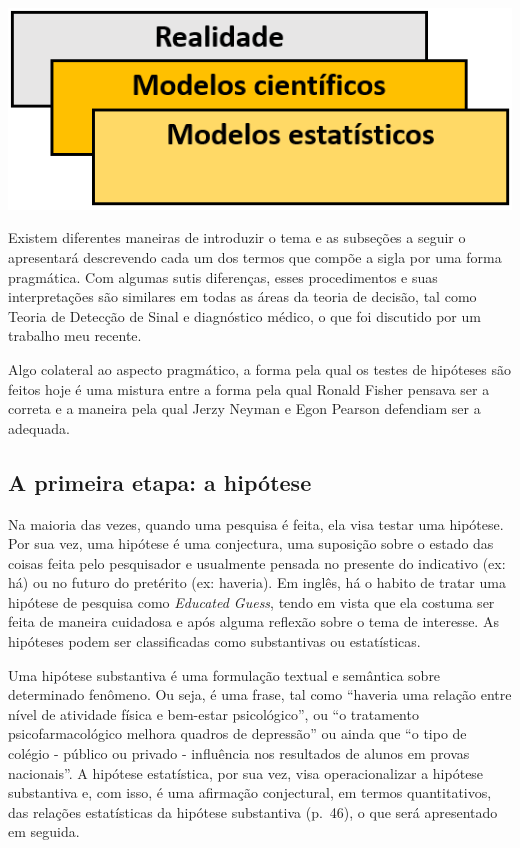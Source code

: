 \documentclass[
]{book}
\begin{document}
\includegraphics{./img/cap_inferencia_modelos_estatisticos.png}

Existem diferentes maneiras de introduzir o tema e as subseções a seguir o apresentará descrevendo cada um dos termos que compõe a sigla por uma forma pragmática. Com algumas sutis diferenças, esses procedimentos e suas interpretações são similares em todas as áreas da teoria de decisão, tal como Teoria de Detecção de Sinal e diagnóstico médico, o que foi discutido por um trabalho meu recente.

Algo colateral ao aspecto pragmático, a forma pela qual os testes de hipóteses são feitos hoje é uma mistura entre a forma pela qual Ronald Fisher pensava ser a correta e a maneira pela qual Jerzy Neyman e Egon Pearson defendiam ser a adequada.

\hypertarget{a-primeira-etapa-a-hipuxf3tese}{%
\subsection{A primeira etapa: a hipótese}\label{a-primeira-etapa-a-hipuxf3tese}}

Na maioria das vezes, quando uma pesquisa é feita, ela visa testar uma hipótese. Por sua vez, uma hipótese é uma conjectura, uma suposição sobre o estado das coisas feita pelo pesquisador e usualmente pensada no presente do indicativo (ex: há) ou no futuro do pretérito (ex: haveria). Em inglês, há o habito de tratar uma hipótese de pesquisa como \emph{Educated Guess}, tendo em vista que ela costuma ser feita de maneira cuidadosa e após alguma reflexão sobre o tema de interesse. As hipóteses podem ser classificadas como substantivas ou estatísticas.

Uma hipótese substantiva é uma formulação textual e semântica sobre determinado fenômeno. Ou seja, é uma frase, tal como ``haveria uma relação entre nível de atividade física e bem-estar psicológico'', ou ``o tratamento psicofarmacológico melhora quadros de depressão'' ou ainda que ``o tipo de colégio - público ou privado - influência nos resultados de alunos em provas nacionais''. A hipótese estatística, por sua vez, visa operacionalizar a hipótese substantiva e, com isso, é uma afirmação conjectural, em termos quantitativos, das relações estatísticas da hipótese substantiva (p.~46), o que será apresentado em seguida.
\end{document}
